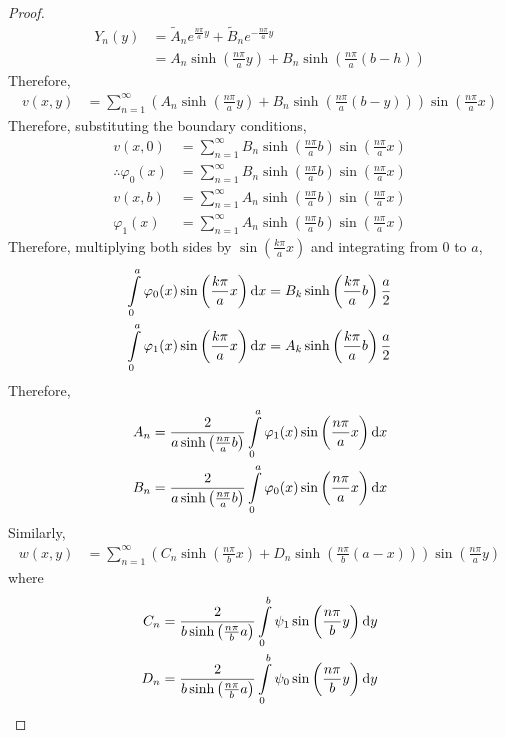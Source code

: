 \documentclass[titlepage, fleqn, a4paper, 12pt, twoside]{article}
\theoremstyle{definition}
\theoremstyle{theorem}
\renewcommand{\tilde}{\widetilde}
\begin{document}
\begin{proof}
	\begin{align*}
		Y_n(y) & = \tilde{A}_n e^{\frac{n \pi}{a} y} + \tilde{B}_n e^{-\frac{n \pi}{a} y} \\
                       & = A_n \sinh\left( \frac{n \pi}{a} y \right) + B_n \sinh\left( \frac{n \pi}{a} (b - h) \right)
	\end{align*}
	Therefore,
	\begin{align*}
		v(x,y) & = \sum\limits_{n = 1}^{\infty} \left( A_n \sinh\left( \frac{n \pi}{a} y \right) + B_n \sinh\left( \frac{n \pi}{a} (b - y) \right) \right) \sin\left( \frac{n \pi}{a} x \right)
	\end{align*}
	Therefore, substituting the boundary conditions,
	\begin{align*}
		v(x,0)                  & = \sum\limits_{n = 1}^{\infty} B_n \sinh\left( \frac{n \pi}{a} b \right) \sin\left( \frac{n \pi}{a} x \right) \\
		\therefore \varphi_0(x) & = \sum\limits_{n = 1}^{\infty} B_n \sinh\left( \frac{n \pi}{a} b \right) \sin\left( \frac{n \pi}{a} x \right) \\
		v(x,b)                  & = \sum\limits_{n = 1}^{\infty} A_n \sinh\left( \frac{n \pi}{a} b \right) \sin\left( \frac{n \pi}{a} x \right) \\
		\varphi_1(x)            & = \sum\limits_{n = 1}^{\infty} A_n \sinh\left( \frac{n \pi}{a} b \right) \sin\left( \frac{n \pi}{a} x \right)
	\end{align*}
	Therefore, multiplying both sides by $\sin\left( \frac{k \pi}{a} x \right)$ and integrating from $0$ to $a$,
	\begin{align*}
		\int\limits_{0}^{a} \varphi_0(x) \sin\left( \frac{k \pi}{a} x \right) \dif x & = B_k \sinh\left( \frac{k \pi}{a} b \right) \frac{a}{2} \\
		\int\limits_{0}^{a} \varphi_1(x) \sin\left( \frac{k \pi}{a} x \right) \dif x & = A_k \sinh\left( \frac{k \pi}{a} b \right) \frac{a}{2}
	\end{align*}
	Therefore,
	\begin{align*}
		A_n & = \frac{2}{a \sinh\left( \frac{n \pi}{a} b \right)} \int\limits_{0}^{a} \varphi_1(x) \sin\left( \frac{n \pi}{a} x \right) \dif x \\
		B_n & = \frac{2}{a \sinh\left( \frac{n \pi}{a} b \right)} \int\limits_{0}^{a} \varphi_0(x) \sin\left( \frac{n \pi}{a} x \right) \dif x
	\end{align*}
	Similarly,
	\begin{align*}
		w(x,y) & = \sum\limits_{n = 1}^{\infty} \left( C_n \sinh\left( \frac{n \pi}{b} x \right) + D_n \sinh\left( \frac{n \pi}{b} (a - x) \right) \right) \sin\left( \frac{n \pi}{a} y \right)
	\end{align*}
	where
	\begin{align*}
		C_n & = \frac{2}{b \sinh\left( \frac{n \pi}{b} a \right)} \int\limits_{0}^{b} \psi_1 \sin\left( \frac{n \pi}{b} y \right) \dif y \\
		D_n & = \frac{2}{b \sinh\left( \frac{n \pi}{b} a \right)} \int\limits_{0}^{b} \psi_0 \sin\left( \frac{n \pi}{b} y \right) \dif y
	\end{align*}
\end{proof}
\end{document}
